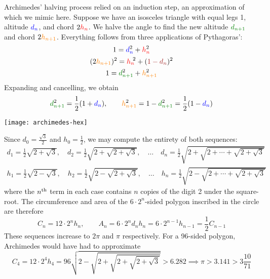 \begin{minipage}[t]{0.64\linewidth}\vspace{-5pt}
Archimedes' halving process relied on an induction step, an approximation of which we mimic here. Suppose we have an isosceles triangle with equal legs 1, altitude $\textcolor{blue}{d_n}$, and chord $2\textcolor{red}{h_n}$. We halve the angle to find the new altitude $\textcolor{Green}{d_{n+1}}$ and chord $2\textcolor{orange}{h_{n+1}}$. Everything follows from three applications of Pythagoras':
\begin{gather*}
1=\textcolor{blue}{d}^2_{\textcolor{blue}{n}} +\textcolor{red}{h}^2_{\textcolor{red}{n}}\\
(2\textcolor{orange}{h_{n+1}})^2=\textcolor{red}{h_n}\!\!\!\!\!{\phantom{h}}^2 +(\textcolor{Brown}{1-d_n})^2\\ 
1=\textcolor{Green}{d}^2_{\textcolor{Green}{n+1}} +\textcolor{orange}{h}^2_{\textcolor{orange}{n+1}}
\end{gather*}
Expanding and cancelling, we obtain
\[\textcolor{Green}{d}^2_{\textcolor{Green}{n+1}}=\frac 12(1+\textcolor{blue}{d}_{\textcolor{blue}{n}}),\qquad \textcolor{orange}{h}^2_{\textcolor{orange}{n+1}}=1-\textcolor{Green}{d}^2_{\textcolor{Green}{n+1}} =\frac 12(1-\textcolor{blue}{d}_{\textcolor{blue}{n}})\]
\end{minipage}\hfill\begin{minipage}[t]{0.35\linewidth}\vspace{0pt}
\flushright\texttt{[image: archimedes-hex]}
\end{minipage}\medbreak
Since $d_0=\frac{\sqrt 3}2$ and $h_0=\frac 12$, we may compute the entirety of both sequences:
\begin{gather*}
d_1=\frac 12\sqrt{2+\sqrt 3},\quad d_2=\frac 12\sqrt{2+\sqrt{2+\sqrt 3}},\quad\ldots\quad d_n=\frac 12\sqrt{2+\sqrt{2+\cdots+\sqrt{2+\sqrt 3}}}\\
h_1=\frac 12\sqrt{2-\sqrt 3},\quad h_2=\frac 12\sqrt{2-\sqrt{2+\sqrt 3}},\quad\ldots\quad h_n=\frac 12\sqrt{2-\sqrt{2+\cdots+\sqrt{2+\sqrt 3}}}
\end{gather*}
where the $n\textsuperscript{th}$ term in each case contains $n$ copies of the digit 2 under the square-root. The circumference and area of the $6\cdot 2^n$-sided polygon inscribed in the circle are therefore
\[C_n=12\cdot 2^nh_n,\qquad A_n=6\cdot 2^nd_nh_n=6\cdot 2^{n-1}h_{n-1}=\frac 12C_{n-1}\]
These sequences increase to $2\pi$ and $\pi$ respectively. For a 96-sided polygon, Archimedes would have had to approximate
\[C_4=12\cdot 2^4h_4=96\sqrt{2-\sqrt{2+\sqrt{2+\sqrt{2+\sqrt 3}}}}> 6.282\implies \pi>3.141>3\frac{10}{71}\]

